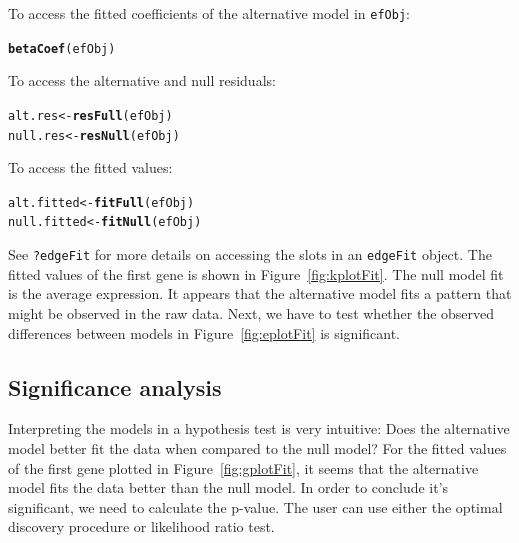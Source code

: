 \documentclass{article}\usepackage[]{graphicx}\usepackage[]{color}
\makeatletter
\newcommand{\hlstd}[1]{\textcolor[rgb]{0.345,0.345,0.345}{#1}}%
\newcommand{\hlkwb}[1]{\textcolor[rgb]{0.69,0.353,0.396}{#1}}%
\newcommand{\hlkwd}[1]{\textcolor[rgb]{0.737,0.353,0.396}{\textbf{#1}}}%
\newenvironment{kframe}{%
 \def\at@end@of@kframe{}%
 \ifinner\ifhmode%
  \def\at@end@of@kframe{\end{minipage}}%
  \begin{minipage}{\columnwidth}%
 \fi\fi%
 \def\FrameCommand##1{\hskip\@totalleftmargin \hskip-\fboxsep
 \colorbox{shadecolor}{##1}\hskip-\fboxsep
     \hskip-\linewidth \hskip-\@totalleftmargin \hskip\columnwidth}%
 \MakeFramed {\advance\hsize-\width
   \@totalleftmargin\z@ \linewidth\hsize
   \@setminipage}}%
 {\par\unskip\endMakeFramed%
 \at@end@of@kframe}
\newenvironment{knitrout}{}{} %
\makeatother
\begin{document}
To access the fitted coefficients of the alternative model in {\tt efObj}:
\begin{knitrout}
\color{fgcolor}\begin{kframe}
\begin{alltt}
\hlkwd{betaCoef}\hlstd{(efObj)}
\end{alltt}
\end{kframe}
\end{knitrout}
To access the alternative and null residuals:
\begin{knitrout}
\color{fgcolor}\begin{kframe}
\begin{alltt}
\hlstd{alt.res} \hlkwb{<-} \hlkwd{resFull}\hlstd{(efObj)}
\hlstd{null.res} \hlkwb{<-} \hlkwd{resNull}\hlstd{(efObj)}
\end{alltt}
\end{kframe}
\end{knitrout}
To access the fitted values:
\begin{knitrout}
\color{fgcolor}\begin{kframe}
\begin{alltt}
\hlstd{alt.fitted} \hlkwb{<-} \hlkwd{fitFull}\hlstd{(efObj)}
\hlstd{null.fitted} \hlkwb{<-} \hlkwd{fitNull}\hlstd{(efObj)}
\end{alltt}
\end{kframe}
\end{knitrout}

See {\tt ?edgeFit} for more details on accessing the slots in an {\tt edgeFit} object. The fitted values of the first gene is shown in Figure~\ref{fig:kplotFit}. The null model fit is the average expression. It appears that the alternative model fits a pattern that might be observed in the raw data. Next, we have to test whether the observed differences between models in Figure~\ref{fig:eplotFit} is significant.

\subsection{Significance analysis}
Interpreting the models in a hypothesis test is very intuitive: Does the alternative model better fit the data when compared to the null model? For the fitted values of the first gene plotted in Figure~\ref{fig:gplotFit}, it seems that the alternative model fits the data better than the null model. In order to conclude it's significant, we need to calculate the p-value. The user can use either the optimal discovery procedure or likelihood ratio test. 
\end{document}
